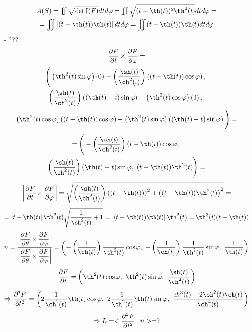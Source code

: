 \documentclass[main]{subfiles}
\begin{document}
\begin{sol}
      \begin{multline*}
        $$A(S) = \iint \sqrt{\det \RNumb{1}(F)} dt d\varphi =
        \iint \sqrt{(t-\th(t))^2 \th^2 (t)} dt d\varphi =\\
        =\iint \abs{(t-\th(t)) \th (t)} dt d\varphi = \iint (t-\th(t)) \th (t) dt d\varphi$$
      \end{multline*}
      - ???
      \begin{multline*}
        $$\dfrac{\d F}{\d t} \times \dfrac{\d F}{\d \varphi} = \\
          \Bigg(
            \Br{\th^2 (t)\sin \varphi} \Br{0} -
              \Br{\frac{\sh(t)}{\ch^2(t)}} \Br{(t-\th(t))\cos \varphi},\ \\
            \Br{\frac{\sh(t)}{\ch^2(t)}} \Br{(\th(t)-t)\sin \varphi} -
              \Br{\th^2 (t)\cos \varphi} \Br{0},\ \\
            \Br{\th^2 (t)\cos \varphi} \Br{(t-\th(t))\cos \varphi}
              - \Br{\th^2 (t)\sin \varphi} \Br{(\th(t)-t)\sin \varphi}
          \Bigg) =
        $$
      \end{multline*}
      \begin{multline*}
        $$
          =\Bigg(
            -\Br{\dfrac{\sh(t)}{\ch^2(t)}} (t-\th(t))\cos \varphi,\ \\
            \Br{\frac{\sh(t)}{\ch^2(t)}} (\th(t)-t)\sin \varphi,\
            (t-\th(t))\th^2 (t)
          \Bigg) =
        $$
      \end{multline*}
      \[\abs{\dfrac{\d F}{\d t} \times \dfrac{\d F}{\d \varphi}} =
      \sqrt{
        \Br{\dfrac{\sh(t)}{\ch^2(t)}} \Br{(t-\th(t))}^2 +
        \Br{(t-\th(t))\th^2 (t)}^2
      }=\]
      \[=\abs{t-\th(t)} \th^2 (t) \sqrt{\dfrac{1}{\sh^2(t)} + 1} = \abs{(t-\th(t))\th (t)} \th^2 (t) = \th^3 (t) (t-\th(t))\]
      \[n =
      \dfrac{
        \dfrac{\d F}{\d \theta} \times \dfrac{\d F}{\d \varphi}
      }{
        \abs{\dfrac{\d F}{\d \theta} \times \dfrac{\d F}{\d \varphi}}
      } = \Br{
        -\Br{\dfrac{1}{\ch(t)}} \dfrac{1}{\th^2 (t)} \cos \varphi,\
        -\Br{\frac{1}{\ch(t)}} \dfrac{1}{\th^2 (t)} \sin \varphi,\
        \dfrac{1}{\th (t)}
      }
      \]
      \[\frac{\d F}{\d t} = \Br{
        \th^2 (t)\cos \varphi,\
        \th^2 (t)\sin \varphi,\
        \frac{\sh(t)}{\ch^2(t)}
      }\]
      \[\Ra \frac{\d^2 F}{\d t^2} = \Br{
        2 \dfrac{1}{\ch^2 (t)} \th (t) \cos \varphi,\
        2 \dfrac{1}{\ch^2 (t)} \th (t) \sin \varphi,\
        \dfrac{ch^3 (t) - 2 \sh^2 (t) \ch (t)}{\ch^4 (t)}
      }\]
      \[\Rightarrow L = <\frac{\partial^2 F}{\partial t^2},\ \overline{n}> = ?\]

\end{sol}
\end{document}
